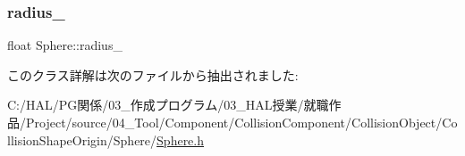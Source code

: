 \subsubsection{\texorpdfstring{radius\+\_\+}{radius\_}}
{\footnotesize\ttfamily float Sphere\+::radius\+\_\+}



このクラス詳解は次のファイルから抽出されました\+:\begin{DoxyCompactItemize}
\item 
C\+:/\+H\+A\+L/\+P\+G関係/03\+\_\+作成プログラム/03\+\_\+\+H\+A\+L授業/就職作品/\+Project/source/04\+\_\+\+Tool/\+Component/\+Collision\+Component/\+Collision\+Object/\+Collision\+Shape\+Origin/\+Sphere/\mbox{\hyperlink{_sphere_8h}{Sphere.\+h}}\end{DoxyCompactItemize}
